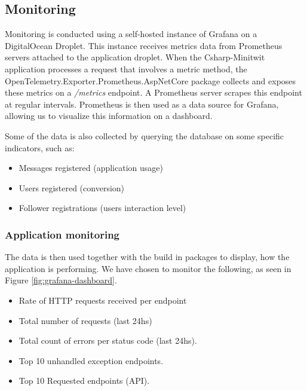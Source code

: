 
\subsection{Monitoring}
Monitoring is conducted using a self-hosted instance of Grafana on a DigitalOcean Droplet. This instance receives metrics data from Prometheus servers attached to the application droplet. When the Csharp-Minitwit application processes a request that involves a metric method, the OpenTelemetry.Exporter.Prometheus.AspNetCore package collects and exposes these metrics on a \textit{/metrics} endpoint. A Prometheus server scrapes this endpoint at regular intervals. Prometheus is then used as a data source for Grafana, allowing us to visualize this information on a dashboard.\newline

Some of the data is also collected by querying the database on some specific indicators, such as:
\begin{itemize}
    \item Messages registered (application usage)
    \item Users registered (conversion)
    \item Follower registrations (users interaction level)
\end{itemize}

\subsubsection{Application monitoring}
The data is then used together with the build in packages to display, how the application is performing. We have chosen to monitor the following, as seen in Figure \ref{fig:grafana-dashboard}.
\begin{itemize}
    \item Rate of HTTP requests received per endpoint
    \item Total number of requests (last 24hs)
    \item Total count of errors per status code (last 24hs).
    \item Top 10 unhandled exception endpoints.
    \item Top 10 Requested endpoints (API).
\end{itemize}

